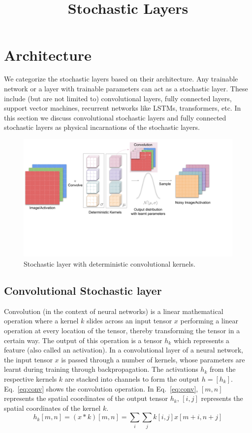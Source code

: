 \documentclass[12pt, letterpaper]{article}
\title{Stochastic Layers}
\date{}
\begin{document}
\vspace{-5cm}
\maketitle
\vspace{-2cm}
\section{Architecture}
We categorize the stochastic layers based on their architecture.
Any trainable network or a layer with trainable parameters can act as a stochastic layer. 
These include (but are not limited to) convolutional layers, fully connected layers, support vector machines, recurrent networks like LSTMs, transformers, etc. In this section we discuss convolutional stochastic layers and fully connected stochastic layers as physical incarnations of the stochastic layers.  
\begin{figure}[h!]
    \centering
    \includegraphics[width=\textwidth, trim={0 5cm 2.5cm 0}, clip]{deterministic(1).pdf}
    \caption{Stochastic layer with deterministic convolutional kernels.}
    \label{fig:deterministic}
\end{figure}

\subsection{Convolutional Stochastic layer}
\label{sec:conv}
Convolution (in the context of neural networks) is a linear mathematical operation where a kernel $k$ slides across an input tensor $x$ performing a linear operation at every location of the tensor, thereby transforming the tensor in a certain way. 
The output of this operation is a tensor $h_k$ which represents a feature (also called an activation). 
In a convolutional layer of a neural network, the input tensor $x$ is passed through a number of kernels, whose parameters are learnt during training through backpropagation. 
The activations $h_k$ from the respective kernels $k$ are stacked into channels to form the output $h=[h_k]$. Eq.~\eqref{eq:conv} shows the convolution operation. 
In Eq.~\eqref{eq:conv}, $[m,n]$ represents the spatial coordinates of the output tensor $h_k$, $[i,j]$ represents the spatial coordinates of the kernel $k$.
\begin{equation}
  h_k[m,n]=(x * k)[m,n]=\sum_i \sum_j k[i,j]x[m+i,n+j]
  \label{eq:conv}
\end{equation}
\end{document}

